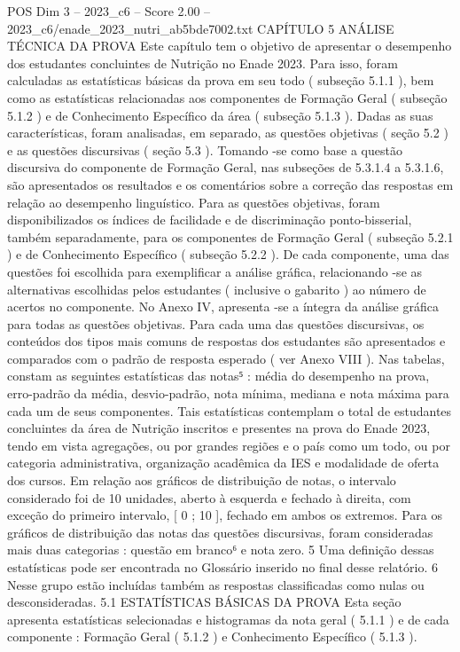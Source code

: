 \begin{textsample}{POS Dim 3 – 2023\_c6 – Score 2.00 – 2023\_c6/enade\_2023\_nutri\_ab5bde7002.txt}  \label{ex:f3_pos_109}
CAPÍTULO 5 ANÁLISE TÉCNICA DA PROVA Este capítulo tem o objetivo de apresentar o desempenho dos estudantes concluintes de Nutrição no Enade 2023.
Para isso, foram calculadas as estatísticas básicas da prova em seu todo ( subseção 5.1.1 ), bem como as estatísticas relacionadas aos componentes de Formação Geral ( subseção 5.1.2 ) e de Conhecimento Específico da área ( subseção 5.1.3 ).
Dadas as suas características, foram analisadas, em separado, as questões objetivas ( seção 5.2 ) e as questões discursivas ( seção 5.3 ).
Tomando -se como base a questão discursiva do componente de Formação Geral, nas subseções de 5.3.1.4 a 5.3.1.6, são apresentados os resultados e os comentários sobre a correção das respostas em relação ao desempenho linguístico.
Para as questões objetivas, foram disponibilizados os índices de facilidade e de discriminação ponto-bisserial, também separadamente, para os componentes de Formação Geral ( subseção 5.2.1 ) e de Conhecimento Específico ( subseção 5.2.2 ).
De cada componente, uma das questões foi escolhida para exemplificar a análise gráfica, relacionando -se as alternativas escolhidas pelos estudantes ( inclusive o gabarito ) ao número de acertos no componente.
No Anexo IV, apresenta -se a íntegra da análise gráfica para todas as questões objetivas.
Para cada uma das questões discursivas, os conteúdos dos tipos mais comuns de respostas dos estudantes são apresentados e comparados com o padrão de resposta esperado ( ver Anexo VIII ).
Nas tabelas, constam as seguintes estatísticas das notas⁵ : média do desempenho na prova, erro-padrão da média, desvio-padrão, nota mínima, mediana e nota máxima para cada um de seus componentes.
Tais estatísticas contemplam o total de estudantes concluintes da área de Nutrição inscritos e presentes na prova do Enade 2023, tendo em vista agregações, ou por grandes regiões e o país como um todo, ou por categoria administrativa, organização acadêmica da IES e modalidade de oferta dos cursos.
Em relação aos gráficos de distribuição de notas, o intervalo considerado foi de 10 unidades, aberto à esquerda e fechado à direita, com exceção do primeiro intervalo, [ 0 ; 10 ], fechado em ambos os extremos.
Para os gráficos de distribuição das notas das questões discursivas, foram consideradas mais duas categorias : questão em branco⁶ e nota zero. 5 Uma definição dessas estatísticas pode ser encontrada no Glossário inserido no final desse relatório. 6 Nesse grupo estão incluídas também as respostas classificadas como nulas ou desconsideradas. 5.1 ESTATÍSTICAS BÁSICAS DA PROVA Esta seção apresenta estatísticas selecionadas e histogramas da nota geral ( 5.1.1 ) e de cada componente : Formação Geral ( 5.1.2 ) e Conhecimento Específico ( 5.1.3 ).

\end{textsample}
